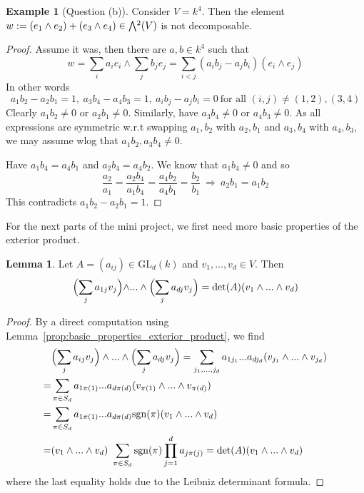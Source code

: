 \documentclass{scrartcl}
\newcommand{\GL}{\mathrm{GL}}
\newcommand{\sgn}{\mathrm{sgn}}
\newcommand{\extpow}{\mathchoice{{\textstyle\bigwedge}}
    {{\bigwedge}}
    {{\textstyle\wedge}}
    {{\scriptstyle\wedge}}}
\theoremstyle{definition}
\newtheorem{lemma}[subsection]{Lemma}
\newtheorem{example}[subsection]{Example}
\begin{document}
\begin{example}[Question (b)]
    Consider $V = k^4$. 
    Then the element $w := (e_1 \wedge e_2) + (e_3 \wedge e_4) \in \extpow^2(V)$ is not decomposable. 
\end{example}
\begin{proof}
    Assume it was, then there are $a, b \in k^4$ such that
    \begin{equation*}
        w = \sum_i a_i e_i \wedge \sum_j b_j e_j = \sum_{i < j} (a_i b_j - a_j b_i) (e_i \wedge e_j)
    \end{equation*}
    In other words
    \begin{equation*}
        a_1b_2 - a_2b_1 = 1, \ a_3b_4 - a_4b_3 = 1, \ a_i b_j - a_j b_i = 0 \ \text{for all $(i, j) \neq (1, 2), (3, 4)$}
    \end{equation*}
    Clearly $a_1 b_2 \neq 0$ or $a_2 b_1 \neq 0$.
    Similarly, have $a_3 b_4 \neq 0$ or $a_4 b_3 \neq 0$.
    As all expressions are symmetric w.r.t swapping $a_1, b_2$ with $a_2, b_1$ and $a_3, b_4$ with $a_4, b_3$, we may assume wlog that $a_1 b_2, a_3 b_4 \neq 0$.

    Have $a_1 b_4 = a_4 b_1$ and $a_2 b_4 = a_4 b_2$.
    We know that $a_1 b_4 \neq 0$ and so
    \begin{equation*}
        \frac {a_2} {a_1} = \frac {a_2 b_4} {a_1 b_4} = \frac {a_4 b_2} {a_4 b_1} = \frac {b_2} {b_1} \ \Rightarrow \ a_2 b_1 = a_1 b_2
    \end{equation*}
    This contradicts $a_1 b_2 - a_2 b_1 = 1$.
\end{proof}
For the next parts of the mini project, we first need more basic properties of the exterior product.
\begin{lemma}
    \label{prop:linear_transform_extpow}
    Let $A = (a_{ij}) \in \GL_d(k)$ and $v_1, ..., v_d \in V$.
    Then
    \begin{equation*}
        \Bigl( \sum_j a_{1j}v_j \Bigl) \wedge ... \wedge \Bigl( \sum_{j} a_{dj} v_j \Bigr) = \det(A) (v_1 \wedge ... \wedge v_d)
    \end{equation*}
\end{lemma}
\begin{proof}
    By a direct computation using Lemma~\ref{prop:basic_properties_exterior_product}, we find
    \begin{align*}
        &\Bigl( \sum_j a_{ij} v_j \Bigr) \wedge ... \wedge \Bigl( \sum_j a_{dj} v_j \Bigr) = \sum_{j_1, ..., j_d} a_{1j_1} ... a_{dj_d} (v_{j_1} \wedge ... \wedge v_{j_d}) \\
        = &\sum_{\pi \in S_d} a_{1\pi(1)} ... a_{d\pi(d)} (v_{\pi(1)} \wedge ... \wedge v_{\pi(d)}) \\
        = &\sum_{\pi \in S_d} a_{1\pi(1)} ... a_{d\pi(d)} \sgn(\pi) (v_1 \wedge ... \wedge v_d) \\
        = &(v_1 \wedge ... \wedge v_d) \ \sum_{\pi \in S_d} \sgn(\pi) \prod_{j = 1}^d a_{j\pi(j)} = \det(A) (v_1 \wedge ... \wedge v_d)
    \end{align*}
    where the last equality holds due to the Leibniz determinant formula.
\end{proof}
\end{document}
